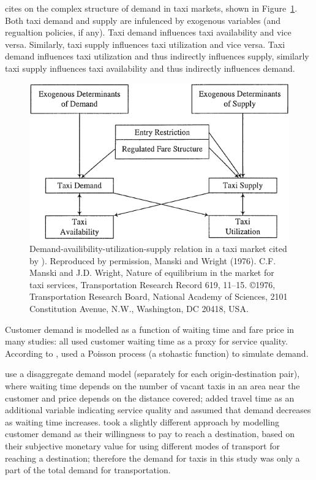 \textcite{Yang2002taxi+demand} cites \textcite{Manski1967taxi+demand} on the
complex structure of demand in taxi markets, shown in Figure~\ref{figure:taxi}.
Both taxi demand and supply are infulenced by exogenous variables (and
regualtion policies, if any). Taxi demand influences taxi availability and vice
versa. Similarly, taxi supply influences taxi utilization and vice versa. Taxi
demand influences taxi utilization and thus indirectly influences supply,
similarly taxi supply influences taxi availability and thus indirectly
influences demand.

\begin{figure}
  \begin{center}
    \includegraphics{../figures/taxi_demand}
    \caption{
      Demand-availibility-utilization-supply relation in a taxi market cited 
      by \textcite{Yang2002taxi+demand}). Reproduced by permission, Manski and
      Wright (1976). C.F. Manski and J.D. Wright, Nature of equilibrium in the 
      market for taxi services, Transportation Research Record 619, 11–15.
      \copyright 1976, Transportation Research Board, National Academy of 
      Sciences, 2101 Constitution Avenue, N.W., Washington, DC 20418, USA.
      \label{figure:taxi}
    }
  \end{center}
\end{figure}

Customer demand is modelled as a function of waiting time and fare price in
many studies: \textcite{Douglas1972taxi+regulation, Devany1975taxi+capacity,
Cairns1996taxi+competition, Yang2002taxi+demand} all used customer waiting time
as a proxy for service quality. According to
\textcite{Salanova2011taxi+review}, \textcite{Manski1967taxi+demand} used a
Poisson process (a stohastic function) to simulate demand.

\textcite{Yang2002taxi+demand} use a disaggregate demand model (separately for
each origin-destination pair), where waiting time depends on the number of
vacant taxis in an area near the customer and price depends on the distance
covered; \textcite{Yang2010taxi+nonlinear} added travel time as an additional
variable indicating service quality and assumed that demand decreases as
waiting time increases. \textcite{Yang2010taxi+equilibria} took a slightly
different approach by modelling customer demand as their willingness to pay to
reach a destination, based on their subjective monetary value for using
different modes of transport for reaching a destination; therefore the demand
for taxis in this study was only a part of the total demand for transportation.
